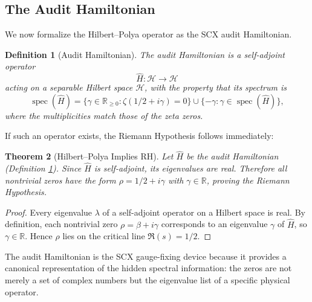 \documentclass[12pt,a4paper]{article}
\newtheorem{theorem}{Theorem}[section]
\newtheorem{definition}[theorem]{Definition}
\theoremstyle{remark}
\newcommand{\R}{\mathbb{R}}
\newcommand{\Hilb}{\mathcal{H}}
\DeclareMathOperator{\spec}{spec}
\begin{document}
\subsection{The Audit Hamiltonian}
\label{sec:audit_hamiltonian}
We now formalize the Hilbert--Polya operator as the SCX audit Hamiltonian.
\begin{definition}[Audit Hamiltonian]
\label{def:audit_hamiltonian}
The \emph{audit Hamiltonian} is a self-adjoint operator
\[
\widehat{H}: \Hilb \to \Hilb
\]
acting on a separable Hilbert space $\Hilb$, with the property that its
spectrum is
\[
\spec(\widehat{H}) = \{\gamma \in \R_{\geq 0} : \zeta(1/2 + i\gamma) = 0\}
\cup \{-\gamma : \gamma \in \spec(\widehat{H})\},
\]
where the multiplicities match those of the zeta zeros.
\end{definition}
If such an operator exists, the Riemann Hypothesis follows immediately:
\begin{theorem}[Hilbert--Polya Implies RH]
\label{thm:hp_gauge}
Let $\widehat{H}$ be the audit Hamiltonian (Definition \ref{def:audit_hamiltonian}).
Since $\widehat{H}$ is self-adjoint, its eigenvalues are real. Therefore all
nontrivial zeros have the form $\rho = 1/2 + i\gamma$ with $\gamma \in \R$,
proving the Riemann Hypothesis.
\end{theorem}
\begin{proof}
Every eigenvalue $\lambda$ of a self-adjoint operator on a Hilbert space is
real. By definition, each nontrivial zero $\rho = \beta + i\gamma$
corresponds to an eigenvalue $\gamma$ of $\widehat{H}$, so $\gamma \in \R$.
Hence $\rho$ lies on the critical line $\Re(s) = 1/2$.
\end{proof}
The audit Hamiltonian is the SCX gauge-fixing device because it provides
a canonical representation of the hidden spectral information: the zeros
are not merely a set of complex numbers but the eigenvalue list of a
specific physical operator.
\end{document}
